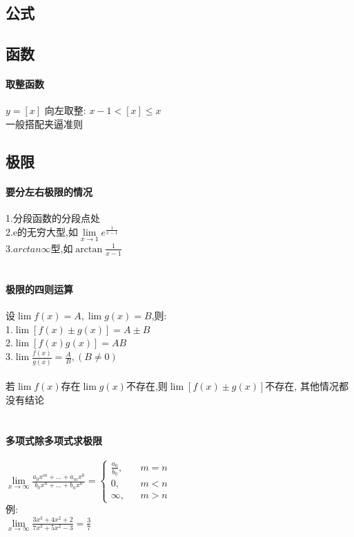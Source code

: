 \documentclass{article}
\begin{document}
\begin{flushleft}
	\LARGE
	
	\section{公式}
	
	\subsection{函数}
	
	\paragraph{取整函数}
	$y=[x]$ 向左取整: $x-1<[x]\leq x$\\
	一般搭配夹逼准则\\\huge

	\subsection{极限}
	
	\paragraph{要分左右极限的情况}
	1.分段函数的分段点处\\
	2.e的无穷大型,如$\lim\limits_{x\to 1} e^{\frac{1}{x-1}}$\\
	3.$arctan\infty$型,如$\arctan{\frac{1}{x-1}}$\\
	~\\
	\paragraph{极限的四则运算}
	设$\lim f(x)=A,\lim g(x)=B$,则:\\
	1.$\lim [f(x)\pm g(x)]=A\pm B$\\
	2.$\lim [f(x)g(x)]=AB$\\
	3.$\lim \frac{f(x)}{g(x)} =\frac{A}{B},(B\neq 0)$\\
	~\\
	若$\lim f(x)$存在$\lim g(x)$不存在,则$\lim [f(x)\pm g(x)]$不存在, 其他情况都没有结论\\
	~\\
	\paragraph{多项式除多项式求极限}
	$\lim\limits_{x\to \infty} \frac{a_0x^m+...+a_mx^0}{b_0x^n+...+b_nx^0}=
	\left\{
	\begin{array}{rcl}
	\frac{a_0}{b_0}, & & {m=n}\\
	0, & & {m<n}\\
	\infty, & & {m>n}
	\end{array} \right.$\\
	例:\\
	$\lim\limits_{x\to \infty} \frac{3x^3+4x^2+2}{7x^3+5x^2-3} = \frac{3}{7}$\\
	~\\

\end{flushleft}
\end{document}
